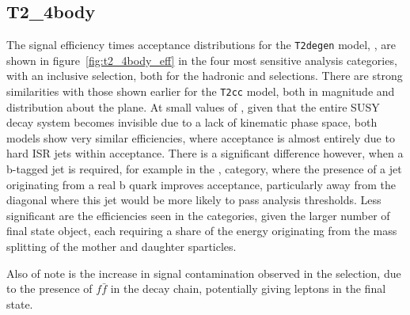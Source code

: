 
\subsection{T2\_4body}
\label{sec:t2degen_eff}

The signal efficiency times acceptance distributions for the \texttt{T2degen} model,
\Ttwodegen, are shown 
in figure~\ref{fig:t2_4body_eff} in the four most sensitive analysis categories,
with an inclusive \HT selection, both for the hadronic and \mj selections. There
are strong similarities with those shown earlier for the \texttt{T2cc} model, 
both in magnitude and distribution about the plane. At small values of \deltam, 
given that the entire SUSY decay system becomes invisible due to a lack of 
kinematic phase space, both models show very similar efficiencies, where 
acceptance is almost entirely due to hard ISR jets within acceptance. There is a
significant difference however, when a b-tagged jet is required, for example in 
the \njlow,  category, where the presence of a jet originating from a real 
b quark improves acceptance, particularly away from the diagonal where this jet 
would be more likely to pass analysis thresholds. Less significant are the 
efficiencies seen in the \njhigh categories, given the larger number of final 
state object, each requiring a share of the energy originating from the mass 
splitting of the mother and daughter sparticles.

Also of note is the increase in signal contamination observed in the \mj 
selection, due to the presence of $f\bar{f}$ in the decay chain, potentially 
giving leptons in the final state.

